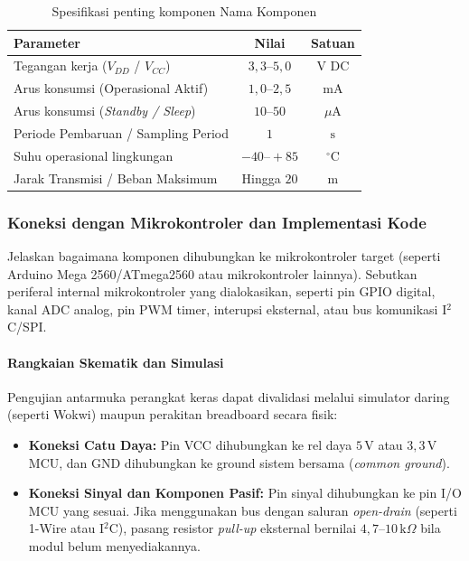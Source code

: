 \begin{table}[H]
	\centering
	\caption{Spesifikasi penting komponen Nama Komponen}
	\label{tab:nama_komponen_spesifikasi}
	\small
	\begin{tabularx}{\textwidth}{@{}Xcc@{}}
		\toprule
		Parameter                                           & Nilai                   & Satuan        \\
		\midrule
		Tegangan kerja ($V_{DD}$ / $V_{CC}$)                & $3{,}3 \text{--} 5{,}0$ & $\text{V DC}$ \\
		Arus konsumsi (Operasional Aktif)                   & $1{,}0 \text{--} 2{,}5$ & $\text{mA}$   \\
		Arus konsumsi (\textit{Standby / Sleep})            & $10 \text{--} 50$       & $\mu\text{A}$ \\
		Periode Pembaruan / Sampling Period                 & $1$                     & $\text{s}$    \\
		Suhu operasional lingkungan                         & $-40 \text{--} +85$     & $^\circ\text{C}$ \\
		Jarak Transmisi / Beban Maksimum                    & Hingga $20$             & $\text{m}$    \\
		\bottomrule
	\end{tabularx}
\end{table}

\subsubsection{Koneksi dengan Mikrokontroler dan Implementasi Kode}
Jelaskan bagaimana komponen dihubungkan ke mikrokontroler target (seperti Arduino Mega 2560/ATmega2560
atau mikrokontroler lainnya). Sebutkan periferal internal mikrokontroler yang dialokasikan,
seperti pin GPIO digital, kanal ADC analog, pin PWM timer, interupsi eksternal, atau bus komunikasi I$^2$C/SPI.

\paragraph{Rangkaian Skematik dan Simulasi}
Pengujian antarmuka perangkat keras dapat divalidasi melalui simulator daring (seperti Wokwi)
maupun perakitan breadboard secara fisik:
\begin{itemize}
	\item \textbf{Koneksi Catu Daya:} Pin VCC dihubungkan ke rel daya $5\,\text{V}$ atau $3{,}3\,\text{V}$ MCU, dan GND dihubungkan ke ground sistem bersama (\textit{common ground}).
	\item \textbf{Koneksi Sinyal dan Komponen Pasif:} Pin sinyal dihubungkan ke pin I/O MCU yang sesuai. Jika menggunakan bus dengan saluran \textit{open-drain} (seperti 1-Wire atau I$^2$C), pasang resistor \textit{pull-up} eksternal bernilai $4{,}7\text{--}10\,\text{k}\Omega$ bila modul belum menyediakannya.
\end{itemize}

